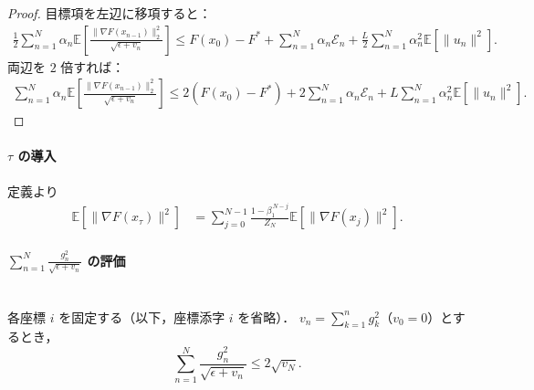 \documentclass[dvipdfmx,a4paper,11pt]{jsarticle}
\begin{document}
\begin{proof}
\medskip
目標項を左辺に移項すると：
\begin{align}
    \frac{1}{2}\sum_{n=1}^N \alpha_n
    \mathbb{E}\!\left[
      \frac{\|\nabla F(x_{n-1})\|_2^2}{\sqrt{\epsilon+v_n}}
    \right]
    \leq
    F(x_0) - F^*
    + \sum_{n=1}^N \alpha_n \mathcal{E}_n
    + \frac{L}{2}\sum_{n=1}^N \alpha_n^2 \mathbb{E}[\|u_n\|^2].
\end{align}
両辺を $2$ 倍すれば：
\begin{align}
    \sum_{n=1}^N \alpha_n
    \mathbb{E}\!\left[
        \frac{\|\nabla F(x_{n-1})\|_2^2}{\sqrt{\epsilon + v_n}}
    \right]
    \leq
    2(F(x_0)-F^*) + 2\sum_{n=1}^N \alpha_n \mathcal{E}_n
    + L\sum_{n=1}^N \alpha_n^2 \mathbb{E}[\|u_n\|^2].
    \tag{65}
\end{align}
\end{proof}

\paragraph{$\tau$ の導入}
定義より
\begin{align}
    \mathbb{E}[\|\nabla F(x_\tau)\|^2]
    &= \sum_{j=0}^{N-1}
    \frac{1-\beta_1^{\,N-j}}{Z_N}
    \mathbb{E}[\|\nabla F(x_j)\|^2].
\end{align}
\paragraph{$\sum_{n=1}^N \frac{g_n^2}{\sqrt{\epsilon + v_n}}$ の評価}\ \\
\noindent
各座標 $i$ を固定する（以下，座標添字 $i$ を省略）．
$v_n = \sum_{k=1}^n g_k^2$（$v_0 = 0$）とするとき，
\[
    \sum_{n=1}^N \frac{g_n^2}{\sqrt{\epsilon + v_n}}
    \leq 2\sqrt{v_N}.
\]
\end{document}
